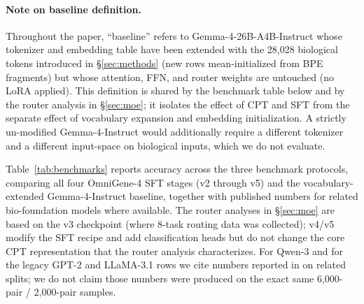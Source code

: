 \documentclass[11pt]{article}
\begin{document}
\paragraph{Note on baseline definition.} Throughout the paper, ``baseline'' refers to Gemma-4-26B-A4B-Instruct whose tokenizer and embedding table have been extended with the 28{,}028 biological tokens introduced in \S\ref{sec:methods} (new rows mean-initialized from BPE fragments) but whose attention, FFN, and router weights are untouched (no LoRA applied). This definition is shared by the benchmark table below and by the router analysis in \S\ref{sec:moe}; it isolates the effect of CPT and SFT from the separate effect of vocabulary expansion and embedding initialization. A strictly un-modified Gemma-4-Instruct would additionally require a different tokenizer and a different input-space on biological inputs, which we do not evaluate.

Table~\ref{tab:benchmarks} reports accuracy across the three benchmark protocols, comparing all four OmniGene-4 SFT stages (v2 through v5) and the vocabulary-extended Gemma-4-Instruct baseline, together with published numbers for related bio-foundation models where available. The router analyses in \S\ref{sec:moe} are based on the v3 checkpoint (where 8-task routing data was collected); v4/v5 modify the SFT recipe and add classification heads but do not change the core CPT representation that the router analysis characterizes. For Qwen-3 and for the legacy GPT-2 and LLaMA-3.1 rows we cite numbers reported in \citep{wang2026biopaws} on related splits; we do not claim those numbers were produced on the exact same 6{,}000-pair / 2{,}000-pair samples.
\end{document}
